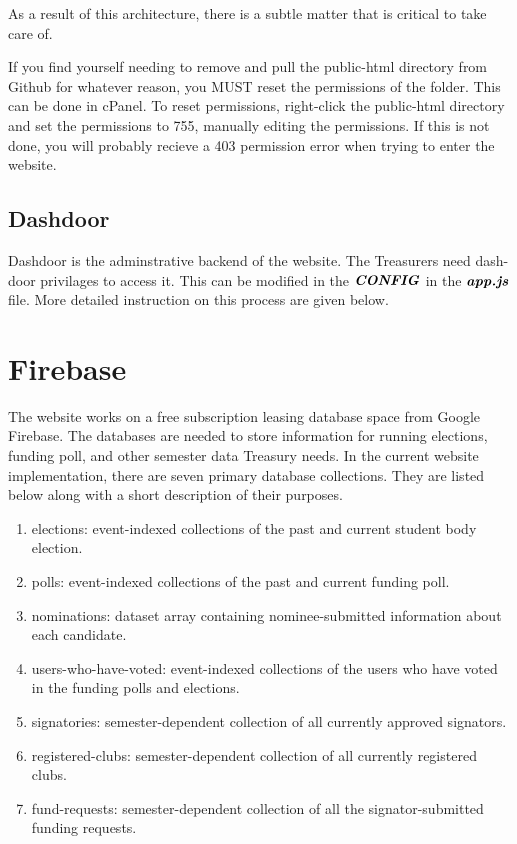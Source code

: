 \documentclass[a4paper]{article}
\begin{document}
As a result of this architecture, there is a subtle matter that is critical to take care of.

\begin{warning*}
If you find yourself needing to remove and pull the public-html directory from Github for whatever reason, you MUST reset the permissions of the folder. This can be done in cPanel. To reset permissions, right-click the public-html directory and set the permissions to 755, manually editing the permissions. If this is not done, you will probably recieve a 403 permission error when trying to enter the website.
\end{warning*}

\subsection{Dashdoor}
Dashdoor is the adminstrative backend of the website. The Treasurers need dash-door privilages to access it. This can be modified in the $\textbf{\textit{CONFIG}}$ in the $\textbf{\textit{app.js}}$ file. More detailed instruction on this process are given below.


\newpage
\section{Firebase}

The website works on a free subscription leasing database space from Google Firebase. The databases are needed to store information for
running elections, funding poll, and other semester data Treasury needs. In the current website implementation, there are seven primary database collections. They are listed below along with a short description of their purposes.

\begin{enumerate}
  \item elections: event-indexed collections of the past and current student body election.
  \item polls: event-indexed collections of the past and current funding poll.
  \item nominations: dataset array containing nominee-submitted information about each candidate.
  \item users-who-have-voted: event-indexed collections of the users who have voted in the funding polls and elections.
  \item signatories: semester-dependent collection of all currently approved signators.
  \item registered-clubs: semester-dependent collection of all currently registered clubs.
  \item fund-requests: semester-dependent collection of all the signator-submitted funding requests.
\end{enumerate}
\end{document}
